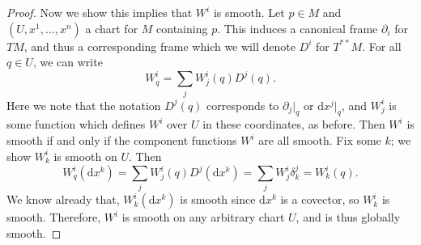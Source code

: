 \documentclass[11pt, letterpaper]{article}
\begin{document}
\begin{proof}
	Now we show this implies that $W^i$ is smooth. Let $p\in M$ and $(U,x^1, \ldots ,x^n)$ a chart for $M$ containing $p$. This induces a canonical frame $\partial _i$ for $TM$, and thus a corresponding frame which we will denote $D^i$ for $T^{* *} M$. For all $q\in U$, we can write
	\[
		W^i_q = \sum_{j} W^i_j(q)D^j(q)
	.\]
	Here we note that the notation $D^j(q)$ corresponds to $\partial _j|_q$ or $\mathrm{d} x^j|_q$, and $W^i_j$ is some function which defines $W^i$ over $U$ in these coordinates, as before. Then $W^i$ is smooth if and only if the component functions $W^i$ are all smooth. Fix some $k$; we show $W^i_k$ is smooth on $U$. Then
	\[
		W^i_q(\mathrm{d} x^k)=\sum_{j} W^i_j(q)D^j(\mathrm{d} x^k)=\sum_{j} W^i_j \delta ^j_k = W^i_k(q)
	.\]
	We know already that, $W^i_k(\mathrm{d} x^k)$ is smooth since $\mathrm{d} x^k$ is a covector, so $W^i_k$ is smooth. Therefore, $W^i$ is smooth on any arbitrary chart $U$, and is thus globally smooth.
\end{proof}
\end{document}
